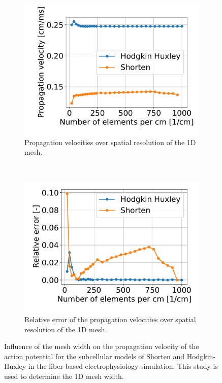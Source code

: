 \begin{figure}%
  \centering%
  \begin{subfigure}[t]{0.45\textwidth}%
    \centering%
    \includegraphics[width=\textwidth]{images/results/studies/propagation_velocity.pdf}%
    \caption{Propagation velocities over spatial resolution of the 1D mesh.}%
    \label{fig:propagation_velocity_comparison}%
  \end{subfigure}
  \,
  \begin{subfigure}[t]{0.45\textwidth}%
    \centering%
    \includegraphics[width=\textwidth]{images/results/studies/propagation_velocity_rel_error.pdf}%
    \caption{Relative error of the propagation velocities over spatial resolution of the 1D mesh.}%
    \label{fig:propagation_velocity_rel_error}%
  \end{subfigure}   
  \caption{Influence of the mesh width on the propagation velocity of the action potential for the subcellular models of Shorten and Hodgkin-Huxley in the fiber-based electrophysiology simulation. This study is used to determine the 1D mesh width.}%
  \label{fig:propagation_velocity}%
\end{figure}%

